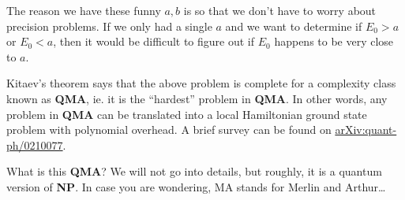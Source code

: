 \documentclass[a4paper]{article}
\begin{document}
The reason we have these funny $a, b$ is so that we don't have to worry about precision problems. If we only had a single $a$ and we want to determine if $E_0 > a$ or $E_0 < a$, then it would be difficult to figure out if $E_0$ happens to be very close to $a$.

Kitaev's theorem says that the above problem is complete for a complexity class known as \textbf{QMA}, ie. it is the ``hardest'' problem in \textbf{QMA}. In other words, any problem in \textbf{QMA} can be translated into a local Hamiltonian ground state problem with polynomial overhead. A brief survey can be found on \href{https://arxiv.org/abs/quant-ph/0210077}{arXiv:{}quant-ph/0210077}.

What is this \textbf{QMA}? We will not go into details, but roughly, it is a quantum version of \textbf{NP}. In case you are wondering, MA stands for Merlin and Arthur\ldots
\printindex
\end{document}
